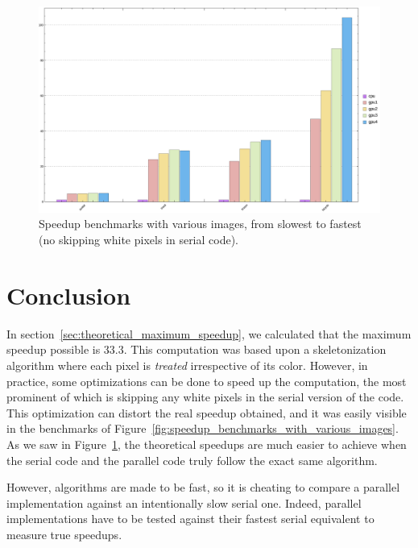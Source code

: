 \documentclass[11pt,a4paper]{article}
\begin{document}
        \begin{figure}[h]
            \centering
            \includegraphics[width=\textwidth]{figs/benchmarks_barplot_unoptimized.pdf}
            \caption{Speedup benchmarks with various images, from slowest to fastest (no skipping white pixels in serial code).}
            \label{fig:speedup_benchmarks_with_various_images_unoptimized}
        \end{figure}

        \section{Conclusion}
            In section~\ref{sec:theoretical_maximum_speedup}, we calculated that the maximum speedup possible is 33.3.
            This computation was based upon a skeletonization algorithm where each pixel is \emph{treated} irrespective of its color.
            However, in practice, some optimizations can be done to speed up the computation, the most prominent of which is skipping any white pixels in the serial version of the code.
            This optimization can distort the real speedup obtained, and it was easily visible in the benchmarks of Figure~\ref{fig:speedup_benchmarks_with_various_images}.
            As we saw in Figure~\ref{fig:speedup_benchmarks_with_various_images_unoptimized}, the theoretical speedups are much easier to achieve when the serial code and the parallel code truly follow the exact same algorithm.

            However, algorithms are made to be fast, so it is cheating to compare a parallel implementation against an intentionally slow serial one.
            Indeed, parallel implementations have to be tested against their fastest serial equivalent to measure true speedups.
\end{document}
